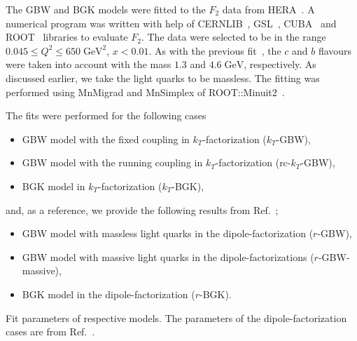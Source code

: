 \documentclass[11pt]{article}
\numberwithin{equation}{section}
\numberwithin{table}{section}
\numberwithin{figure}{section}
\begin{document}
The GBW and BGK models were fitted to the $F_2$ data from HERA~\cite{Abt:2017nkc}. A numerical program was written with help of CERNLIB~\cite{Kolbig:1972zz}, GSL~\cite{GSL}, CUBA~\cite{Hahn:2004fe} and ROOT~\cite{Brun:1997pa} libraries to evaluate $F_2$. The data were selected to be in the range $0.045\leq Q^2\leq 650\;\mathrm{GeV^2}$, $x<0.01$.
As with the previous fit~\cite{Goda:2022wsc}, the $c$ and $b$ flavours were taken into account with the mass $1.3$ and $4.6\;\mathrm{GeV}$, respectively. As discussed earlier, we take the light quarks to be massless.
The fitting was performed using MnMigrad and MnSimplex of ROOT::Minuit2~\cite{James:2004xla}.

The fits were performed for the following cases
\begin{itemize}
\item GBW model with the fixed coupling in $k_T$-factorization  ($k_T$-GBW),
\item GBW model with the running coupling in $k_T$-factorization (rc-$k_T$-GBW),
\item BGK model in $k_T$-factorization ($k_T$-BGK),
\end{itemize} 
and, as a reference, we provide the following results from Ref.~\cite{Goda:2022wsc};
\begin{itemize}
\item GBW model with massless light quarks in the dipole-factorization ($r$-GBW),
\item GBW model with massive light quarks in the dipole-factorizations ($r$-GBW-massive),
\item  BGK model in  the dipole-factorization ($r$-BGK).
\end{itemize} 

\begin{table}[t]
\begin{subtable}{\textwidth}
\center\footnotesize

\vspace{2mm}
\end{subtable}
\begin{subtable}{\textwidth}
\center\footnotesize

\vspace{2mm}
\end{subtable}
\caption{Fit parameters of respective models. The parameters of the
dipole-factorization cases are from Ref.~\cite{Goda:2022wsc}.}
\label{tab:table}
\end{table}
\end{document}
